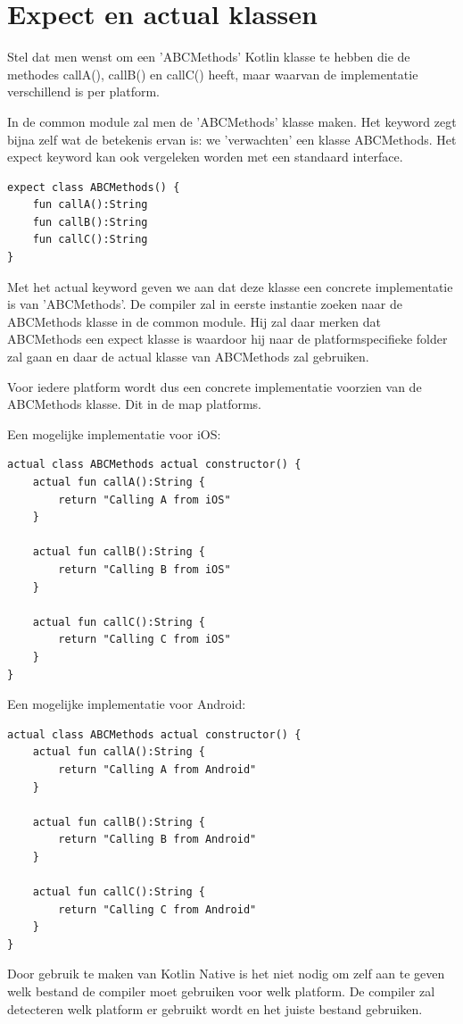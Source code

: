 \section {Expect en actual klassen}
\label{sec:expectandactual}
Stel dat men wenst om een 'ABCMethods' Kotlin klasse te hebben die de methodes callA(), callB() en callC() heeft, maar waarvan de implementatie verschillend is per platform.

In de common module zal men de 'ABCMethods' klasse maken. Het keyword zegt bijna zelf wat de betekenis ervan is: we 'verwachten' een klasse ABCMethods. Het expect keyword kan ook vergeleken worden met een standaard interface.

\begin{lstlisting}
expect class ABCMethods() {
	fun callA():String
	fun callB():String
	fun callC():String
}
\end{lstlisting}

Met het actual keyword geven we aan dat deze klasse een concrete implementatie is van 'ABCMethods'. De compiler zal in eerste instantie zoeken naar de ABCMethods klasse in de common module. Hij zal daar merken dat ABCMethods een expect klasse is waardoor hij naar de platformspecifieke folder zal gaan en daar de actual klasse van ABCMethods zal gebruiken.

Voor iedere platform wordt dus een concrete implementatie voorzien van de ABCMethods klasse. Dit in de map platforms.

Een mogelijke implementatie voor iOS:
\begin{lstlisting}
actual class ABCMethods actual constructor() {
	actual fun callA():String {
		return "Calling A from iOS"
	}
	
	actual fun callB():String {
		return "Calling B from iOS"
	}
	
	actual fun callC():String {
		return "Calling C from iOS"
	}
}
\end{lstlisting}

Een mogelijke implementatie voor Android:
\begin{lstlisting}
actual class ABCMethods actual constructor() {
	actual fun callA():String {
		return "Calling A from Android"
	}
	
	actual fun callB():String {
		return "Calling B from Android"
	}
	
	actual fun callC():String {
		return "Calling C from Android"
	}
}
\end{lstlisting}

Door gebruik te maken van Kotlin Native is het niet nodig om zelf aan te geven welk bestand de compiler moet gebruiken voor welk platform. De compiler zal detecteren welk platform er gebruikt wordt en het juiste bestand gebruiken.

